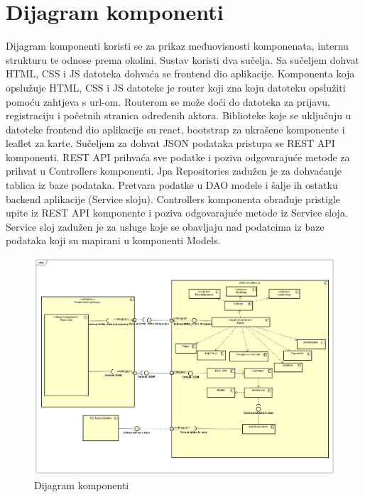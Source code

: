 			
			\eject
		\clearpage
		
		\section{Dijagram komponenti}
		
			 Dijagram komponenti koristi se za prikaz međuovisnosti komponenata, internu strukturu te odnose prema okolini. Sustav koristi dva sučelja. Sa sučeljem dohvat HTML, CSS i JS datoteka dohvaća se frontend dio aplikacije. Komponenta koja opslužuje HTML, CSS i JS datoteke je router koji zna koju datoteku opslužiti pomoću zahtjeva s url-om. Routerom se može doći do datoteka za prijavu, registraciju i početnih stranica određenih aktora. Biblioteke koje se uključuju u datoteke frontend dio aplikacije su react, bootstrap za ukrašene komponente i leaflet za karte. 
			 Sučeljem za dohvat JSON podataka pristupa se REST API komponenti. REST API prihvaća sve podatke i
			 poziva odgovarajuće metode za prihvat u Controllers komponenti. Jpa Repositories zadužen je za 
			 dohvaćanje tablica iz baze podataka. Pretvara podatke u DAO modele i šalje ih ostatku backend
			 aplikacije (Service sloju). Controllers komponenta obrađuje pristigle upite iz REST API komponente
			 i poziva odgovarajuće metode iz Service sloja. Service sloj zadužen je za usluge koje se obavljaju nad
			 podatcima iz baze podataka koji su mapirani u komponenti Models.
			 
			 \begin{figure}[H]
			 	\includegraphics[width=\linewidth]{dijagrami/Dijagram komponenti.png}
			 	\centering
			 	\caption{Dijagram komponenti}
			 	\label{fig:dijagram_komponenti}
			 \end{figure}
			 
			 
			 \eject
